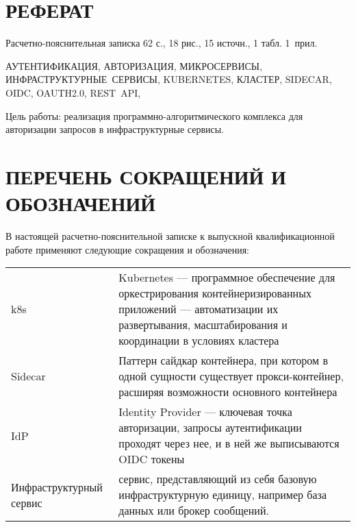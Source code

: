 {\centering \chapter*{РЕФЕРАТ}}

Расчетно-пояснительная записка 62 с., 18 рис., 15 источн., 1 табл. \mbox{1 прил.}

\noindent \mbox{АУТЕНТИФИКАЦИЯ}, \mbox{АВТОРИЗАЦИЯ}, \mbox{МИКРОСЕРВИСЫ}, \mbox{ИНФРАСТРУКТУРНЫЕ СЕРВИСЫ}, \mbox{KUBERNETES}, \mbox{КЛАСТЕР},  \mbox{SIDECAR}, \mbox{OIDC}, \mbox{OAUTH2.0}, \mbox{REST API},

Цель работы: реализация программно-алгоритмического комплекса для авторизации запросов в инфраструктурные сервисы.

{\centering \maketableofcontents}

{\centering \chapter*{ПЕРЕЧЕНЬ СОКРАЩЕНИЙ И ОБОЗНАЧЕНИЙ}}

В настоящей расчетно-пояснительной записке к выпускной квалификационной работе применяют следующие сокращения и обозначения:

\begin{table}[H]
\begin{tabular}{p{5cm}p{10.5cm}}
k8s & Kubernetes --- программное обеспечение для оркестрирования контейнеризированных приложений --- автоматизации их развертывания, масштабирования и координации в условиях кластера
\tabularnewline
Sidecar & Паттерн сайдкар контейнера, при котором в одной сущности существует прокси-контейнер, расширяя возможности основного контейнера
\tabularnewline
IdP & Identity Provider --- ключевая точка авторизации, запросы аутентификации проходят через нее, и в ней же выписываются OIDC токены
\tabularnewline
Инфраструктурный сервис & сервис, представляющий из себя базовую инфраструктурную единицу, например база данных или брокер сообщений.
\tabularnewline
\end{tabular}
\end{table}